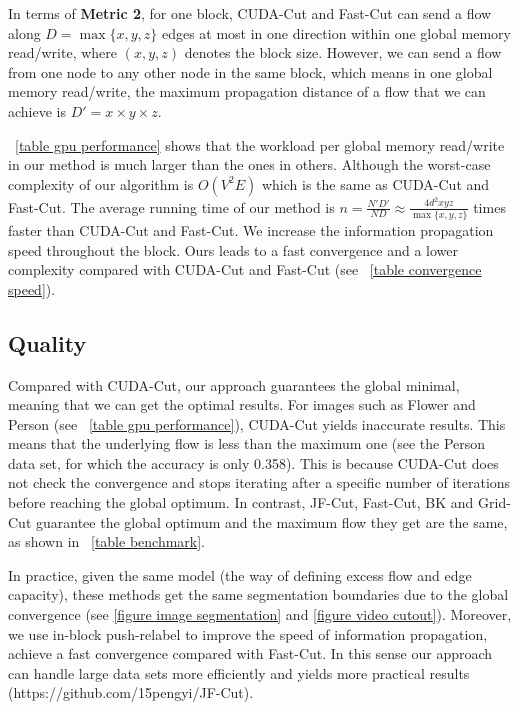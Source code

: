 In terms of \textbf{Metric 2}, for one block, CUDA-Cut and Fast-Cut can send a flow along $D=\max{\{x, y, z\}}$ edges at most in one direction within one global memory read/write, where $(x, y, z)$ denotes the block size.
However, we can send a flow from one node to any other node in the same block, which means in one global memory read/write, the maximum propagation distance of a flow that we can achieve is $D'=x \times y \times z$.

\tablename \ \ref{table gpu performance} shows that the workload per global memory read/write in our method is much larger than the ones in others.
Although the worst-case complexity of our algorithm is $O(V^2 E)$ which is the same as CUDA-Cut and Fast-Cut.
The average running time of our method is $n = \frac{N'D'}{ND} \approx \frac{4d^2xyz}{\max{\{x, y, z\}}}$ times faster than CUDA-Cut and Fast-Cut.
We increase the information propagation speed throughout the block.
Ours leads to a fast convergence and a lower complexity compared with CUDA-Cut and Fast-Cut (see \tablename \ \ref{table convergence speed}).

\subsection{\textbf{Quality}}

Compared with CUDA-Cut, our approach guarantees the global minimal, meaning that we can get the optimal results.
For images such as Flower and Person (see \tablename \ \ref{table gpu performance}), CUDA-Cut yields inaccurate results.
This means that the underlying flow is less than the maximum one (see the Person data set, for which the accuracy is only 0.358).
This is because CUDA-Cut does not check the convergence and stops iterating after a specific number of iterations before reaching the global optimum.
In contrast, JF-Cut, Fast-Cut, BK and Grid-Cut guarantee the global optimum and the maximum flow they get are the same, as shown in \tablename \ \ref{table benchmark}.

In practice, given the same model (the way of defining excess flow and edge capacity), these methods get the same segmentation boundaries due to the global convergence (see \figurename \ref{figure image segmentation} and \figurename \ref{figure video cutout}).
Moreover, we use in-block push-relabel to improve the speed of information propagation, achieve a fast convergence compared with Fast-Cut.
In this sense our approach can handle large data sets more efficiently and yields more practical results (https://github.com/15pengyi/JF-Cut).

